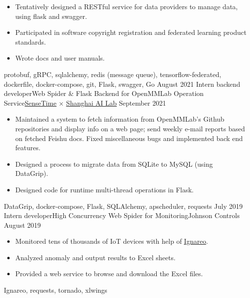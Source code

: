 \begin{experiences}
{\begin{itemize}
                        \item Tentatively designed a RESTful service for data providers to manage data, using flask and swagger.
                        \item Participated in software copyright registration and federated learning product standards.
                        \item Wrote docs and user manuals.
                      \end{itemize}
                    }
                    {protobuf, gRPC, sqlalchemy, redis (message queue), tensorflow-federated, dockerfile, docker-compose, git, Flask, swagger, Go}
  \emptySeparator
  \experience
    {August 2021}     {Intern backend developer}{Web Spider \& Flask Backend for OpenMMLab Operation Service}{\href{https://www.sensetime.com/}{\underline{SenseTime}} × \href{https://www.shlab.org.cn/}{\underline{Shanghai AI Lab}}}
    {September 2021}    {
                      \begin{itemize}
                        \item Maintained a system to fetch information from OpenMMLab's Github repositories and display info on a web page; send weekly e-mail reports based on fetched Feishu docs. Fixed miscellaneous bugs and implemented back end features.
                        \item Designed a process to migrate data from SQLite to MySQL (using DataGrip). 
                        \item Designed code for runtime multi-thread operations in Flask. 
                      \end{itemize}
                    }
                    {DataGrip, docker-compose, Flask, SQLAlchemy, apscheduler, requests}
  \emptySeparator
  \experience
    {July 2019}     {Intern developer}{High Concurrency Web Spider for Monitoring}{Johnson Controls}
    {August 2019}    {
                      \begin{itemize}
                        \item Monitored tens of thousands of IoT devices with help of \href{https://github.com/Hecate2/Ignareo-ISML-auto-voter}{\underline{Ignareo}}. 
                        \item Analyzed anomaly and output results to Excel sheets.
                        \item Provided a web service to browse and download the Excel files.
                      \end{itemize}
                    }
                    {Ignareo, requests, tornado, xlwings}
  \emptySeparator

\end{experiences}
